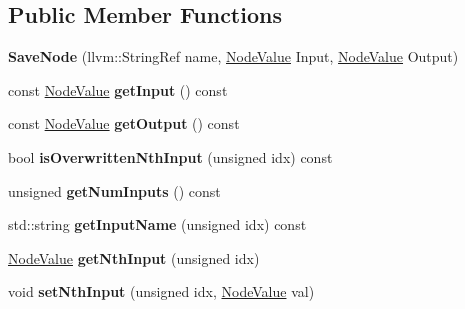 \subsection*{Public Member Functions}
\begin{DoxyCompactItemize}
\item 
\mbox{\label{classglow_1_1_save_node_a56dcd7da6c6ee4c42da47ab7a3eb1b9c}} 
{\bfseries Save\+Node} (llvm\+::\+String\+Ref name, \hyperlink{structglow_1_1_node_value}{Node\+Value} Input, \hyperlink{structglow_1_1_node_value}{Node\+Value} Output)
\item 
\mbox{\label{classglow_1_1_save_node_aa998491a935ed059c0d561e39c0d3775}} 
const \hyperlink{structglow_1_1_node_value}{Node\+Value} {\bfseries get\+Input} () const
\item 
\mbox{\label{classglow_1_1_save_node_a122ea1a6e148c43f78abbd7355c3633f}} 
const \hyperlink{structglow_1_1_node_value}{Node\+Value} {\bfseries get\+Output} () const
\item 
\mbox{\label{classglow_1_1_save_node_a3c53610a385a22e946bca8b422e2c375}} 
bool {\bfseries is\+Overwritten\+Nth\+Input} (unsigned idx) const
\item 
\mbox{\label{classglow_1_1_save_node_a9217bf84d68dba0e5034464ad7da9a3c}} 
unsigned {\bfseries get\+Num\+Inputs} () const
\item 
\mbox{\label{classglow_1_1_save_node_a9eb3345f2553a181a82d5befd6d2c62c}} 
std\+::string {\bfseries get\+Input\+Name} (unsigned idx) const
\item 
\mbox{\label{classglow_1_1_save_node_af84dd9e9a3bda435428726f93e09e2ad}} 
\hyperlink{structglow_1_1_node_value}{Node\+Value} {\bfseries get\+Nth\+Input} (unsigned idx)
\item 
\mbox{\label{classglow_1_1_save_node_af2ea906c1aacb8b0378bca0d7b7f3f00}} 
void {\bfseries set\+Nth\+Input} (unsigned idx, \hyperlink{structglow_1_1_node_value}{Node\+Value} val)
\item 
\mbox{\label{classglow_1_1_save_node_a5fcd3743a1eaeb27e718da92bd3936ac}} 

\end{DoxyCompactItemize}
